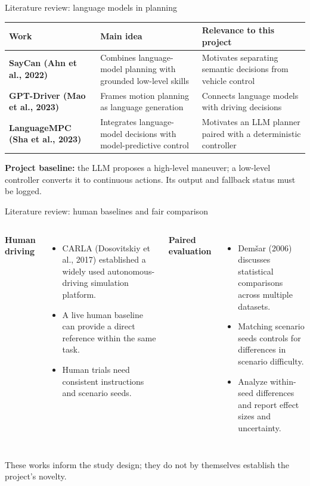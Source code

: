 \documentclass[aspectratio=169,10pt]{beamer}
\begin{document}
\begin{frame}{Literature review: language models in planning}
\small
\begin{tabularx}{\textwidth}{>{\bfseries}p{} X X}
\toprule
Work & Main idea & Relevance to this project \\
\midrule
SayCan (Ahn et al., 2022) & Combines language-model planning with grounded low-level skills & Motivates separating semantic decisions from vehicle control \\
GPT-Driver (Mao et al., 2023) & Frames motion planning as language generation & Connects language models with driving decisions \\
LanguageMPC (Sha et al., 2023) & Integrates language-model decisions with model-predictive control & Motivates an LLM planner paired with a deterministic controller \\
\bottomrule
\end{tabularx}
\vspace{0.7em}
\textbf{Project baseline:} the LLM proposes a high-level maneuver; a low-level controller converts it to continuous actions. Its output and fallback status must be logged.
\end{frame}

\begin{frame}{Literature review: human baselines and fair comparison}
\begin{columns}[T]
\textbf{Human driving}
\begin{itemize}
  \item CARLA (Dosovitskiy et al., 2017) established a widely used autonomous-driving simulation platform.
  \item A live human baseline can provide a direct reference within the same task.
  \item Human trials need consistent instructions and scenario seeds.
\end{itemize}
\textbf{Paired evaluation}
\begin{itemize}
  \item Dem\v{s}ar (2006) discusses statistical comparisons across multiple datasets.
  \item Matching scenario seeds controls for differences in scenario difficulty.
  \item Analyze within-seed differences and report effect sizes and uncertainty.
\end{itemize}
\end{columns}
\vspace{0.4em}
These works inform the study design; they do not by themselves establish the project's novelty.
\end{frame}
\end{document}
